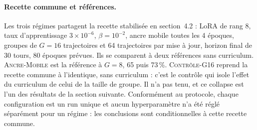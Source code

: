 \documentclass[11pt,a4paper]{article}
\begin{document}
\paragraph{Recette commune et références.} Les trois régimes partagent la recette stabilisée en section~4.2 : LoRA de rang 8, taux d'apprentissage $3 \times 10^{-6}$, $\beta = 10^{-2}$, ancre mobile toutes les 4 époques, groupes de $G=16$ trajectoires et 64 trajectoires par mise à jour, horizon final de 30 tours, 80 époques prévues. Ils se comparent à deux références sans curriculum. \textsc{Ancre-Mobile} est la référence à $G=8$, 65 puis 73\,\%. \textsc{Contrôle-G16} reprend la recette commune à l'identique, sans curriculum : c'est le contrôle qui isole l'effet du curriculum de celui de la taille de groupe. Il n'a pas tenu, et ce collapse est l'un des résultats de la section suivante. Conformément au protocole, chaque configuration est un run unique et aucun hyperparamètre n'a été réglé séparément pour un régime : les conclusions sont conditionnelles à cette recette commune.
\end{document}
